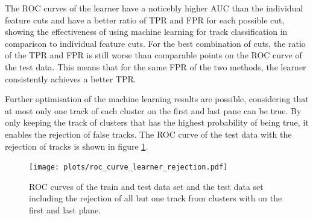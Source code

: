 The ROC curves of the learner have a noticebly higher AUC than the individual feature cuts and have a better ratio of TPR and FPR for each possible cut, showing the effectiveness
of using machine learning for track classification in comparison to individual feature cuts. For the best combination of cuts, the ratio of the TPR and FPR is still worse than
comparable points on the ROC curve of the test data. This means that for the same FPR of the two methods, the learner consistently achieves a better TPR.

Further optimisation of the machine learning results are possible, considering that at most only one track of each cluster
on the first and last pane can be true. By only keeping the track of clusters that has the highest probability of being true, it enables the rejection of
false tracks. The ROC curve of the test data with the rejection of tracks is shown in figure \ref{fig:rejection}.


\begin{figure}
  \centering
  \texttt{[image: plots/roc\_curve\_learner\_rejection.pdf]}
  \caption{ROC curves of the train and test data set and the test data set including the rejection of all but one track from clusters with on the first and last plane.}
  \label{fig:rejection}
\end{figure}
